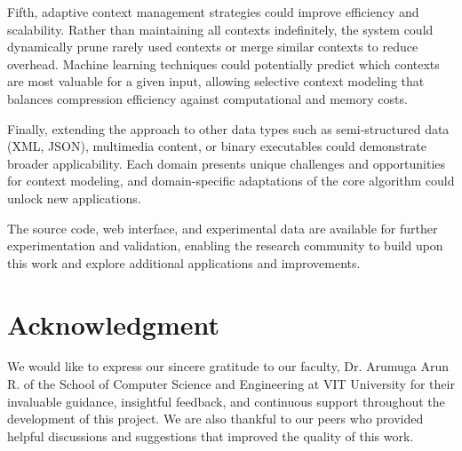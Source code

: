 \documentclass[conference]{IEEEtran}
\begin{document}
Fifth, adaptive context management strategies could improve efficiency and scalability. Rather than maintaining all contexts indefinitely, the system could dynamically prune rarely used contexts or merge similar contexts to reduce overhead. Machine learning techniques could potentially predict which contexts are most valuable for a given input, allowing selective context modeling that balances compression efficiency against computational and memory costs.

Finally, extending the approach to other data types such as semi-structured data (XML, JSON), multimedia content, or binary executables could demonstrate broader applicability. Each domain presents unique challenges and opportunities for context modeling, and domain-specific adaptations of the core algorithm could unlock new applications.

The source code, web interface, and experimental data are available for further experimentation and validation, enabling the research community to build upon this work and explore additional applications and improvements.

\section*{Acknowledgment}
We would like to express our sincere gratitude to our faculty, Dr. Arumuga Arun R. of the School of Computer Science and Engineering at VIT University for their invaluable guidance, insightful feedback, and continuous support throughout the development of this project. We are also thankful to our peers who provided helpful discussions and suggestions that improved the quality of this work.
\end{document}

